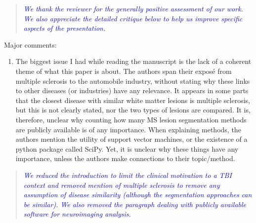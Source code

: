 \documentclass[12pt,]{article}
\providecommand{\tightlist}{%
  \setlength{\itemsep}{0pt}\setlength{\parskip}{0pt}}
\begin{document}
\begin{quote}
\emph{\textcolor{blue}{We thank the reviewer for the generally positive assessment of our work.  We also
appreciate the detailed critique below to help us improve specific aspects of the
presentation.}}
\end{quote}

Major comments:

\begin{enumerate}
\def\labelenumi{\arabic{enumi}.}
\tightlist
\item
  The biggest issue I had while reading the manuscript is the lack of a
  coherent theme of what this paper is about. The authors span their
  exposé from multiple sclerosis to the automobile industry, without
  stating why these links to other diseases (or industries) have any
  relevance. It appears in some parts that the closest disease with
  similar white matter lesions is multiple sclerosis, but this is not
  clearly stated, nor the two types of lesions are compared. It is,
  therefore, unclear why counting how many MS lesion segmentation
  methods are publicly available is of any importance. When explaining
  methods, the authors mention the utility of support vector machines,
  or the existence of a python package called SciPy. Yet, it is unclear
  why these things have any importance, unless the authors make
  connections to their topic/method.
\end{enumerate}

\begin{quote}
\emph{\textcolor{blue}{We reduced the introduction to limit the clinical motivation to a
TBI context and removed mention of multiple sclerosis to remove any assumption of
disease similarity (although the segmentation approaches can be similar).  We also
removed the paragraph dealing with publicly available software for neuroimaging analysis.
}}
\end{quote}
\end{document}
